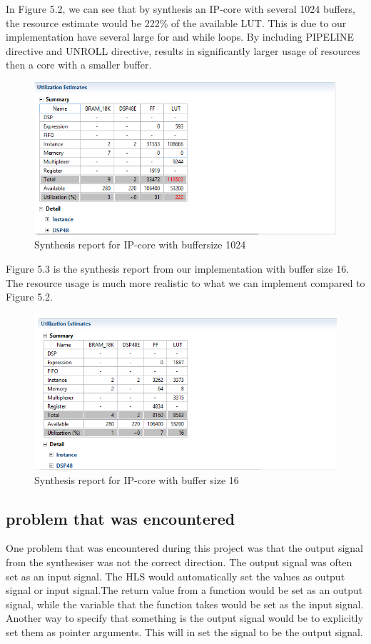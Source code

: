 In Figure 5.2, we can see that by synthesis an IP-core with several 1024 buffers, the resource estimate would be 222\% of the available LUT. This is due to our implementation have several large for and while loops. By including PIPELINE directive and UNROLL directive, results in significantly larger usage of resources then a core with a smaller buffer. 


\begin{figure}[!ht] \label{fig:synthesiseReport1024}
       \centerline{\includegraphics[scale=0.6]{Figures/SynthesisReport_1024}}
    \caption{Synthesis report for IP-core with buffersize 1024}
\end{figure}

Figure 5.3 is the synthesis report from our implementation with buffer size 16. The resource usage is much more realistic to what we can implement compared to Figure 5.2.

 \begin{figure}[!ht] \label{fig:synthesiseReport16}
      \centerline{ \includegraphics[scale=0.6]{Figures/SynthesisReport_16}}
    \caption{Synthesis report for IP-core with buffer size 16}
\end{figure}

 
\subsection*{problem that was encountered}
One problem that was encountered during this project was that the output signal from the synthesiser was not the correct direction. The output signal was often set as an input signal. The HLS would automatically set the values as output signal or input signal.The return value from a function would be set as an output signal, while the variable that the function takes would be set as the input signal. Another way to specify that something is the output signal would be to explicitly set them as pointer arguments. This will in set the signal to be the output signal.

